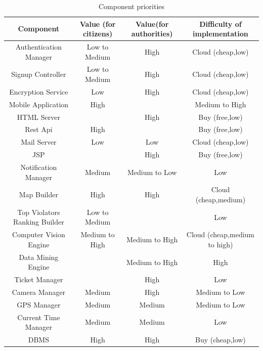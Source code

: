 \documentclass{article}
\begin{document}
\begin{table}[h]
\begin{center}
\caption{Component priorities}
\label{tab:developPriorities}
\small
\begin{tabular}{|c|c|c|c|}
	\hline
	\textbf{Component}				&\textbf{Value (for citizens)}	&\textbf{Value(for authorities)}	&\textbf{Difficulty of implementation}	\\
	\hline
	Authentication Manager			&Low to Medium					&High							&Cloud (cheap,low)						\\
	Signup Controller				&Low	 to Medium					&High							&Cloud (cheap,low)						\\
	Encryption Service				&Low								&High							&Cloud (cheap,low)						\\
	\hline
	Mobile Application				&High							&								&Medium to High							\\ 
	\hline
	HTML Server						&								&High							&Buy	 (free,low)							\\
	Rest Api							&High							&								&Buy (free,low)							\\
	\hline
	Mail Server						&Low								&Low								&Cloud (cheap,low)						\\
	\hline
	JSP								&								&High							&Buy (free,low)							\\ 
	\hline
	Notification Manager				&Medium							&Medium to Low					&Low										\\ 
	\hline
	Map Builder						&High							&High							&Cloud (cheap,medium)					\\ 
	\hline
	Top Violators Ranking Builder	&Low to Medium					&								&Low										\\ 
	\hline
	Computer Vision Engine			&Medium to High					&Medium to High					&Cloud (cheap,medium to high)			\\
	\hline
	Data Mining Engine				&								&Medium to High					&High									\\ 
	\hline
	Ticket Manager					&								&High							&Low										\\
	\hline
	Camera Manager					&Medium							&High							&Medium to Low							\\ 
	\hline
	GPS Manager						&Medium							&Medium							&Medium to Low							\\ 
	\hline
	Current Time Manager				&Medium							&Medium							&Low										\\ 
	\hline
	DBMS								&High							&High							&Buy (cheap,low)							\\
	\hline
\end{tabular}
\end{center}
\end{table}
\end{document}
